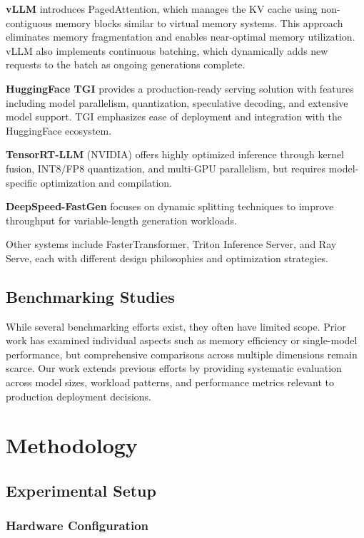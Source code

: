 \documentclass{article}
\begin{document}
\textbf{vLLM} introduces PagedAttention, which manages the KV cache using non-contiguous memory blocks similar to virtual memory systems. This approach eliminates memory fragmentation and enables near-optimal memory utilization. vLLM also implements continuous batching, which dynamically adds new requests to the batch as ongoing generations complete.

\textbf{HuggingFace TGI} provides a production-ready serving solution with features including model parallelism, quantization, speculative decoding, and extensive model support. TGI emphasizes ease of deployment and integration with the HuggingFace ecosystem.

\textbf{TensorRT-LLM} (NVIDIA) offers highly optimized inference through kernel fusion, INT8/FP8 quantization, and multi-GPU parallelism, but requires model-specific optimization and compilation.

\textbf{DeepSpeed-FastGen} focuses on dynamic splitting techniques to improve throughput for variable-length generation workloads.

Other systems include FasterTransformer, Triton Inference Server, and Ray Serve, each with different design philosophies and optimization strategies.

\subsection{Benchmarking Studies}

While several benchmarking efforts exist, they often have limited scope. Prior work has examined individual aspects such as memory efficiency or single-model performance, but comprehensive comparisons across multiple dimensions remain scarce. Our work extends previous efforts by providing systematic evaluation across model sizes, workload patterns, and performance metrics relevant to production deployment decisions.

\section{Methodology}

\subsection{Experimental Setup}

\subsubsection{Hardware Configuration}
\end{document}

